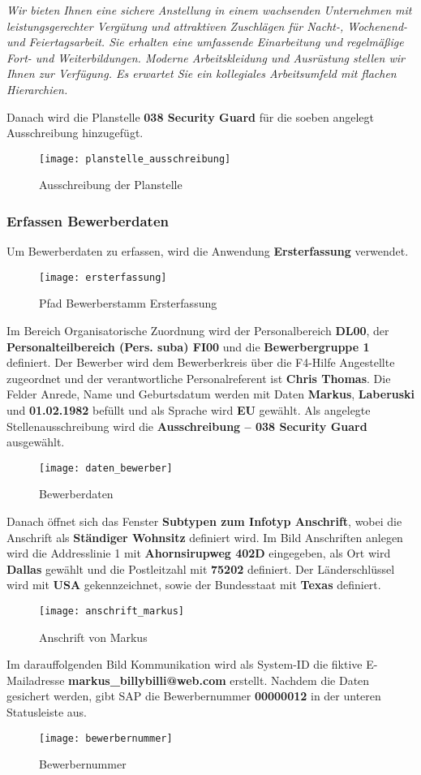 \textsl{
	Wir bieten Ihnen eine sichere Anstellung in einem wachsenden Unternehmen mit leistungsgerechter Vergütung und attraktiven Zuschlägen für Nacht-, Wochenend- und Feiertagsarbeit. Sie erhalten eine umfassende Einarbeitung und regelmäßige Fort- und Weiterbildungen. Moderne Arbeitskleidung und Ausrüstung stellen wir Ihnen zur Verfügung. Es erwartet Sie ein kollegiales Arbeitsumfeld mit flachen Hierarchien.
}

Danach wird die Planstelle \textbf{038 Security Guard} für die soeben angelegt Ausschreibung hinzugefügt.
\begin{figure}[H]
	\centering
	\texttt{[image: planstelle\_ausschreibung]}
	\caption{Ausschreibung der Planstelle}
	\label{fig:planstelle_ausschreibung}
\end{figure}

\subsubsection{Erfassen Bewerberdaten}
Um Bewerberdaten zu erfassen, wird die Anwendung \textbf{Ersterfassung} verwendet.
\begin{figure}[H]
	\centering
	\texttt{[image: ersterfassung]}
	\caption{Pfad Bewerberstamm Ersterfassung}
	\label{fig:ersterfassung}
\end{figure}
Im Bereich Organisatorische Zuordnung wird der Personalbereich \textbf{DL00},  der \textbf{Personalteilbereich (Pers. suba) FI00} und die \textbf{Bewerbergruppe 1} definiert. Der Bewerber wird dem Bewerberkreis über die F4-Hilfe Angestellte zugeordnet und der verantwortliche Personalreferent ist \textbf{Chris Thomas}. Die Felder Anrede, Name und Geburtsdatum werden mit Daten \textbf{Markus}, \textbf{Laberuski} und \textbf{01.02.1982} befüllt und als Sprache wird \textbf{EU} gewählt. Als angelegte Stellenausschreibung wird die \textbf{Ausschreibung – 038 Security Guard} ausgewählt.
\begin{figure}[H]
	\centering
	\texttt{[image: daten\_bewerber]}
	\caption{Bewerberdaten}
	\label{fig:daten_bewerber}
\end{figure}
Danach öffnet sich das Fenster \textbf{Subtypen zum Infotyp Anschrift}, wobei die Anschrift als \textbf{Ständiger Wohnsitz} definiert wird. Im Bild Anschriften anlegen wird die Addresslinie 1 mit \textbf{Ahornsirupweg 402D} eingegeben, als Ort wird \textbf{Dallas} gewählt und die Postleitzahl mit \textbf{75202} definiert. Der Länderschlüssel wird mit \textbf{USA} gekennzeichnet, sowie der Bundesstaat mit \textbf{Texas} definiert.
\begin{figure}[H]
	\centering
	\texttt{[image: anschrift\_markus]}
	\caption{Anschrift von Markus}
	\label{fig:anschrift_markus}
\end{figure}
Im darauffolgenden Bild Kommunikation wird als System-ID die fiktive E-Mailadresse \textbf{markus\_billybilli@web.com} erstellt. Nachdem die Daten gesichert werden, gibt SAP die Bewerbernummer \textbf{00000012} in der unteren Statusleiste aus.
\begin{figure}[H]
	\centering
	\texttt{[image: bewerbernummer]}
	\caption{Bewerbernummer}
	\label{fig:bewerbernummer}
\end{figure}

